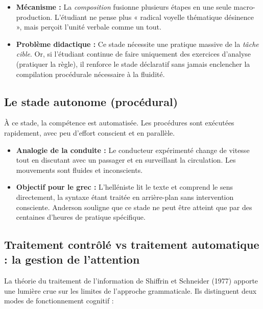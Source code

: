 \begin{itemize}\item \textbf{Mécanisme :} La \textit{composition} fusionne plusieurs étapes en une seule macro-production. L'étudiant ne pense plus « radical \+ voyelle thématique \+ désinence », mais perçoit l'unité verbale comme un tout.\item \textbf{Problème didactique :} Ce stade nécessite une pratique massive de la \textit{tâche cible}. Or, si l'étudiant continue de faire uniquement des exercices d'analyse (pratiquer la règle), il renforce le stade déclaratif sans jamais enclencher la compilation procédurale nécessaire à la fluidité.\cite{III-3-3-ref5}\end{itemize}

\subsection{Le stade autonome (procédural)}

À ce stade, la compétence est automatisée. Les procédures sont exécutées rapidement, avec peu
d'effort conscient et en parallèle.

\begin{itemize}\item \textbf{Analogie de la conduite :} Le conducteur expérimenté change de vitesse tout en discutant avec un passager et en surveillant la circulation. Les mouvements sont fluides et inconscients.\item \textbf{Objectif pour le grec :} L'helléniste lit le texte et comprend le sens directement, la syntaxe étant traitée en arrière-plan sans intervention consciente. Anderson souligne que ce stade ne peut être atteint que par des centaines d'heures de pratique spécifique.\cite{III-3-3-ref6}\end{itemize}

\subsection{Traitement contrôlé vs traitement automatique : la gestion de l'attention}

La théorie du traitement de l'information de Shiffrin et Schneider (1977) apporte une lumière crue
sur les limites de l'approche grammaticale.\cite{III-3-3-ref11} Ils distinguent deux modes de
fonctionnement cognitif :

